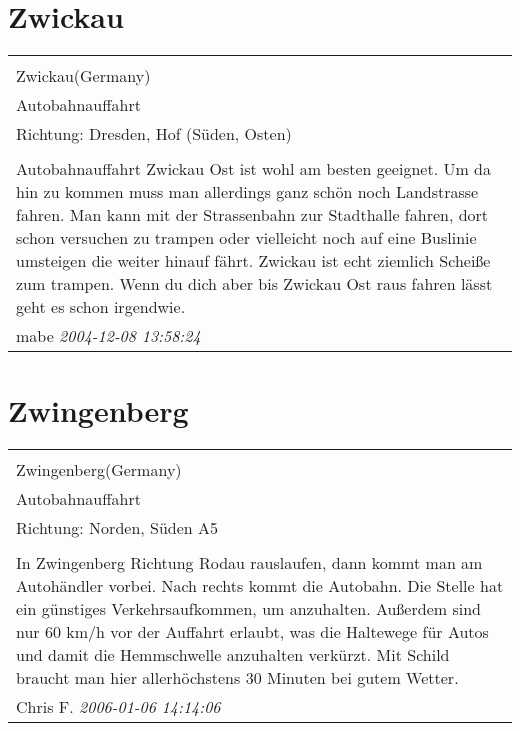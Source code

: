 \documentclass[a4paper,12pt]{article}
\begin{document}
\section{Zwickau}
\begin{tabular}{|p{13cm}|}
\hline\\
Zwickau(Germany)\\
Autobahnauffahrt\\
Richtung: Dresden, Hof (Süden, Osten) \\
\hline\\
Autobahnauffahrt Zwickau Ost ist wohl am besten geeignet. Um da hin zu kommen muss man allerdings ganz schön noch Landstrasse fahren. Man kann mit der Strassenbahn zur Stadthalle fahren, dort schon versuchen zu trampen oder vielleicht noch auf eine Buslinie umsteigen die weiter hinauf fährt. Zwickau ist echt ziemlich Scheiße zum trampen. Wenn du dich aber bis Zwickau Ost raus fahren lässt geht es schon irgendwie. \\
mabe \textit{ 2004-12-08 13:58:24 }\\\hline
\end{tabular}


\section{Zwingenberg}
\begin{tabular}{|p{13cm}|}
\hline\\
Zwingenberg(Germany)\\
Autobahnauffahrt\\
Richtung: Norden, Süden A5 \\
\hline\\
In Zwingenberg Richtung Rodau rauslaufen, dann kommt man am Autohändler vorbei. Nach rechts kommt die Autobahn. Die Stelle hat ein günstiges Verkehrsaufkommen, um anzuhalten. Außerdem sind nur 60 km/h vor der Auffahrt erlaubt, was die Haltewege für Autos und damit die Hemmschwelle anzuhalten verkürzt. Mit Schild braucht man hier allerhöchstens 30 Minuten bei gutem Wetter. \\
Chris F. \textit{ 2006-01-06 14:14:06 }\\\hline
\end{tabular}
\end{document}
